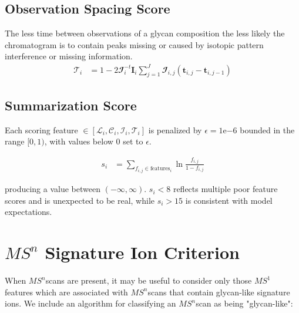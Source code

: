 \documentclass{article}
\newcommand{\msn}[0]{$MS^n$}
\begin{document}
    \subsection{Observation Spacing Score}
        The less time between observations of a glycan composition the less likely the chromatogram
        is to contain peaks missing or caused by isotopic pattern interference or missing information.
        \begin{align}
            \mathscr{T}_i &= 1 - 2\mathbfcal{I}_i^{-t}\mathbf{I}_i\sum_{j=1}^J\mathbfcal{I}_{i, j}(
                \mathbf{t}_{i, j} - \mathbf{t}_{i, j - 1})
        \end{align}

    \subsection{Summarization Score}
        Each scoring feature $\in \left[\mathscr{L}_i, \mathscr{C}_i, \mathscr{I}_i,
        \mathscr{T}_i\right]$ is penalized by $\epsilon = 1\mathrm{e}{-6}$ bounded in
        the range $[0, 1)$, with values below 0 set to $\epsilon$.

        \begin{align}
            s_i &= \sum_{f_{i,j} \in \text{features}_i}{\ln{
                \frac{f_{i, j}}{1 - f_{i, j}}
                }
            }
        \end{align}

        \noindent producing a value between $(-\infty, \infty)$. $s_i < 8$ reflects multiple
        poor feature scores and is unexpected to be real, while $s_i > 15$ is
        consistent with model expectations.

\section{$MS^n$ Signature Ion Criterion}\label{sec:signature_ion_criterion}
    When \msn scans are present, it  may be useful to consider only those $MS^1$
    features which are associated with \msn scans that contain glycan-like signature
    ions. We include an algorithm for classifying an \msn scan as being "glycan-like":
\end{document}
